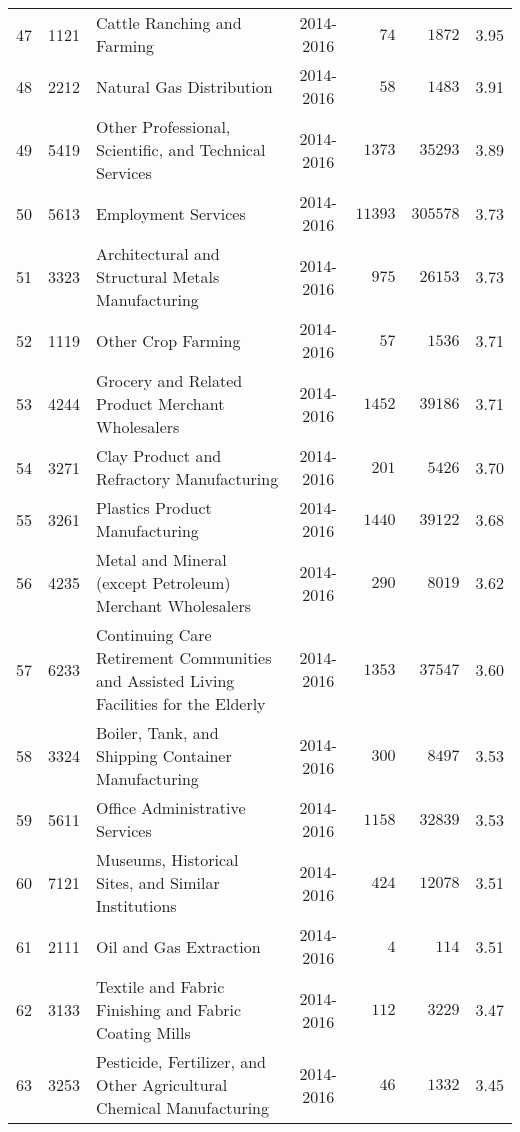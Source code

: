 \documentclass[9pt, oneside]{article}   	%
\begin{document}
\begin{longtable}{lcp{3in}cccc}
47  & 1121 & Cattle Ranching and Farming & 2014-2016 & $\phantom{000}74$ & $\phantom{00}1872$ &  3.95 \\
48  & 2212 & Natural Gas Distribution & 2014-2016 & $\phantom{000}58$ & $\phantom{00}1483$ &  3.91 \\
49  & 5419 & Other Professional, Scientific, and Technical Services & 2014-2016 & $\phantom{0}1373$ & $\phantom{0}35293$ &  3.89 \\
50  & 5613 & Employment Services & 2014-2016 & $11393$ & $305578$ &  3.73 \\
51  & 3323 & Architectural and Structural Metals Manufacturing & 2014-2016 & $\phantom{00}975$ & $\phantom{0}26153$ &  3.73 \\
52  & 1119 & Other Crop Farming & 2014-2016 & $\phantom{000}57$ & $\phantom{00}1536$ &  3.71 \\
53  & 4244 & Grocery and Related Product Merchant Wholesalers & 2014-2016 & $\phantom{0}1452$ & $\phantom{0}39186$ &  3.71 \\
54  & 3271 & Clay Product and Refractory Manufacturing & 2014-2016 & $\phantom{00}201$ & $\phantom{00}5426$ &  3.70 \\
55  & 3261 & Plastics Product Manufacturing & 2014-2016 & $\phantom{0}1440$ & $\phantom{0}39122$ &  3.68 \\
56  & 4235 & Metal and Mineral (except Petroleum) Merchant Wholesalers & 2014-2016 & $\phantom{00}290$ & $\phantom{00}8019$ &  3.62 \\
57  & 6233 & Continuing Care Retirement Communities and Assisted Living Facilities for the Elderly & 2014-2016 & $\phantom{0}1353$ & $\phantom{0}37547$ &  3.60 \\
58  & 3324 & Boiler, Tank, and Shipping Container Manufacturing & 2014-2016 & $\phantom{00}300$ & $\phantom{00}8497$ &  3.53 \\
59  & 5611 & Office Administrative Services & 2014-2016 & $\phantom{0}1158$ & $\phantom{0}32839$ &  3.53 \\
60  & 7121 & Museums, Historical Sites, and Similar Institutions & 2014-2016 & $\phantom{00}424$ & $\phantom{0}12078$ &  3.51 \\
61  & 2111 & Oil and Gas Extraction & 2014-2016 & $\phantom{0000}4$ & $\phantom{000}114$ &  3.51 \\
62  & 3133 & Textile and Fabric Finishing and Fabric Coating Mills & 2014-2016 & $\phantom{00}112$ & $\phantom{00}3229$ &  3.47 \\
63  & 3253 & Pesticide, Fertilizer, and Other Agricultural Chemical Manufacturing & 2014-2016 & $\phantom{000}46$ & $\phantom{00}1332$ &  3.45 \\

\end{longtable}
\end{document}
